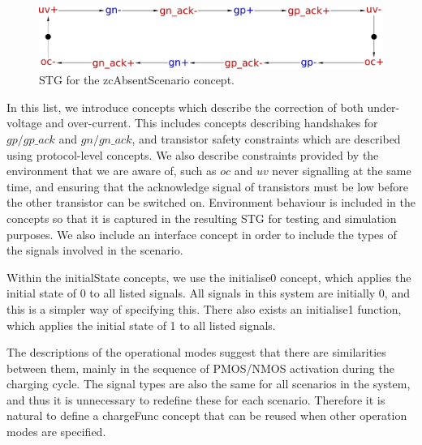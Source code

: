 \documentclass[british,compsoc]{IEEEtran}
\begin{document}
\begin{flushleft}
\begin{figure}[H]
\begin{centering}
\includegraphics[scale=0.22]{Images/stg-UV_without_ZC}
\par\end{centering}

\protect\caption{\label{fig:zcAbsentScenario STG} STG for the \textsf{zcAbsentScenario}
concept.}
\end{figure}

\par\end{flushleft}

In this list, we introduce concepts which describe the correction
of both under-voltage and over-current. This includes concepts describing
handshakes for $gp/gp\_ack$ and $gn/gn\_ack$, and transistor safety
constraints which are described using protocol-level concepts. We
also describe constraints provided by the environment that we are
aware of, such as $oc$ and $uv$ never signalling at the same time, and ensuring that
the acknowledge signal of transistors must be low before the other transistor can be switched on.
Environment behaviour is included in the concepts so that it is captured in the resulting STG for testing and simulation purposes.
We also include an \textsf{interface} concept in order to include the
types of the signals involved in the scenario.

Within the \textsf{initialState} concepts, we use the \textsf{initialise0} concept, which applies the initial state of 0 to all listed signals.
All signals in this system are initially 0, and this is a simpler way of specifying this. There also exists an \textsf{initialise1} function, which
applies the initial state of 1 to all listed signals.

The descriptions of the operational modes suggest that there are similarities
between them, mainly in the sequence of PMOS/NMOS activation during
the charging cycle. The signal types are also the same for all scenarios in the system, and
thus it is unnecessary to redefine these for each scenario.
Therefore it is natural to define a \textsf{chargeFunc}
concept that can be reused when other operation modes are specified.
\end{document}
